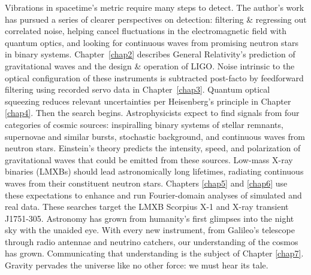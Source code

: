 Vibrations in spacetime's metric require many steps to detect.
The author's work has pursued a series of clearer perspectives on detection: filtering \& regressing out correlated noise, helping cancel fluctuations in the electromagnetic field with quantum optics, and looking for continuous waves from promising neutron stars in binary systems. 
Chapter~\ref{chap2} describes General Relativity's prediction of gravitational waves and the design \& operation of LIGO.
Noise intrinsic to the optical configuration of these instruments is subtracted post-facto by feedforward filtering using recorded servo data in Chapter~\ref{chap3}. 
Quantum optical squeezing reduces relevant uncertainties per Heisenberg's principle in Chapter \ref{chap4}.
Then the search begins.
Astrophysicists expect to find signals from four categories of cosmic sources: inspiralling binary systems of stellar remnants, supernovae and similar bursts, stochastic background, and continuous waves from neutron stars.
Einstein's theory predicts the intensity, speed, and polarization of gravitational waves that could be emitted from these sources.
Low-mass X-ray binaries (LMXBs) should lead astronomically long lifetimes, radiating continuous waves from their constituent neutron stars.
Chapters \ref{chap5} and \ref{chap6} use these expectations to enhance and run Fourier-domain analyses of simulated and real data.
These searches target the LMXB Scorpius X-1 and X-ray transient J1751-305.
Astronomy has grown from humanity's first glimpses into the night sky with the unaided eye. 
With every new instrument, from Galileo's telescope through radio antennae and neutrino catchers, our understanding of the cosmos has grown. 
Communicating that understanding is the subject of Chapter \ref{chap7}.
Gravity pervades the universe like no other force: we must hear its tale. 
        

